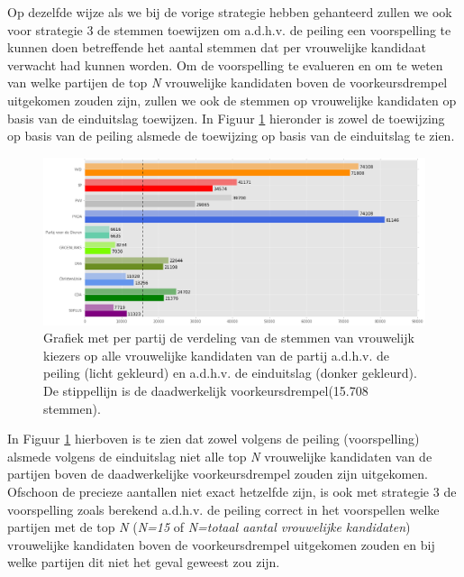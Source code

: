 Op dezelfde wijze als we bij de vorige strategie hebben gehanteerd zullen we ook voor strategie 3 de stemmen toewijzen om a.d.h.v. de peiling een voorspelling te kunnen doen betreffende het aantal stemmen dat per vrouwelijke kandidaat verwacht had kunnen worden. Om de voorspelling te evalueren en om te weten van welke partijen de top \textit{N} vrouwelijke kandidaten boven de voorkeursdrempel uitgekomen zouden zijn, zullen we ook de stemmen op vrouwelijke kandidaten op basis van de einduitslag toewijzen. In Figuur \ref{fig:stemmenS31V} hieronder is zowel de toewijzing op basis van de peiling alsmede de toewijzing op basis van de einduitslag te zien.  



\begin{figure}[H]

	\includegraphics[width=\linewidth]	{stemmen_op_vrouwen_top15_of_topN_samen.png}

			\caption{Grafiek met per partij de verdeling van de stemmen van vrouwelijk kiezers op alle vrouwelijke kandidaten van de partij a.d.h.v. de peiling (licht gekleurd) en a.d.h.v. de einduitslag (donker gekleurd). De stippellijn is de daadwerkelijk voorkeursdrempel(15.708 stemmen).}

\label{fig:stemmenS31V}
\end{figure}

In Figuur \ref{fig:stemmenS31V} hierboven is te zien dat zowel volgens de peiling (voorspelling) alsmede volgens de einduitslag niet alle top \textit{N} vrouwelijke kandidaten van de partijen boven de daadwerkelijke voorkeursdrempel zouden zijn uitgekomen. Ofschoon de precieze aantallen niet exact hetzelfde zijn, is ook met strategie 3 de voorspelling zoals berekend a.d.h.v. de peiling correct in het voorspellen welke partijen met de top \textit{N} (\textit{N=15} of \textit{N=totaal aantal vrouwelijke kandidaten}) vrouwelijke kandidaten boven de voorkeursdrempel uitgekomen zouden en bij welke partijen dit niet het geval geweest zou zijn.


